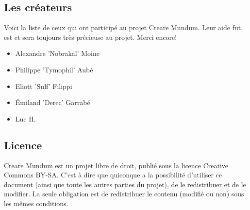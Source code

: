 \documentclass[a4paper, 11pt]{article}
\begin{document}
\subsection{Les créateurs}
Voici la liste de ceux qui ont participé au projet Creare Mundum. Leur aide fut, est et sera toujours très précieuse au projet. Merci encore!  
\begin{itemize}
\item Alexandre ’Nobrakal’ Moine 
\item Philippe ’Tymophil’ Aubé 
\item Eliott ’Sulf’ Filippi
\item Émiland ’Derec’ Garrabé
\item Luc H.
\end{itemize}
\subsection{Licence}
Creare Mundum est un projet libre de droit, publié sous la licence Creative Commons BY-SA. C'est à dire que quiconque a la possibilité d'utiliser ce document (ainsi que toute les autres parties du projet), de le redistribuer et de le modifier. La seule obligation est de redistribuer le contenu (modifié ou non) sous les mêmes conditions.
\end{document}
